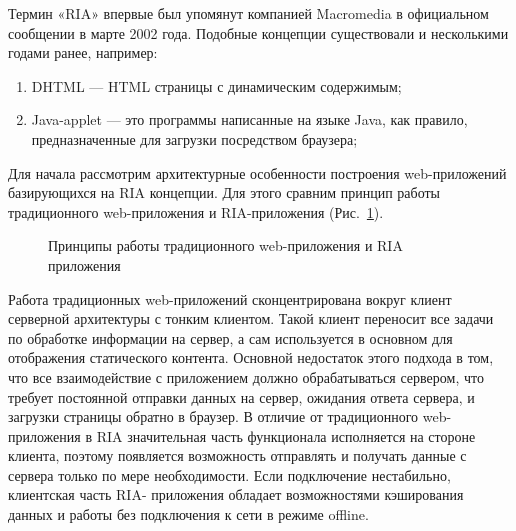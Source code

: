 Термин «RIA» впервые был упомянут компанией Macromedia в официальном сообщении в
марте 2002 года\cite{modeling3}. Подобные концепции существовали и несколькими годами ранее, например:

\begin{enumerate}
\item DHTML --- HTML страницы с динамическим содержимым;
\item Java-applet --- это программы написанные на языке Java, как правило, предназначенные для загрузки посредством
браузера;
\end{enumerate}

Для начала рассмотрим архитектурные особенности построения web-приложений базирующихся 
на RIA концепции. Для этого сравним принцип работы традиционного web-приложения и
RIA-приложения (Рис.~\ref{ris:principlesRIA.png}).
\begin{figure}[ht]
\caption{Принципы работы традиционного web-приложения и RIA приложения}
\label{ris:principlesRIA.png}
\end{figure}

Работа традиционных web-приложений сконцентрирована вокруг клиент серверной архитектуры 
с тонким клиентом. Такой клиент переносит все задачи по обработке информации на сервер,
а сам используется в основном для отображения статического контента. Основной
недостаток этого подхода в том, что все взаимодействие с приложением должно
обрабатываться сервером, что требует постоянной отправки данных на сервер,
ожидания ответа сервера, и загрузки страницы обратно в браузер. В отличие от 
традиционного web-приложения в RIA значительная часть функционала исполняется на
стороне клиента, поэтому появляется возможность отправлять и получать данные с сервера
только по мере необходимости.\cite{modeling1} Если подключение нестабильно, клиентская часть RIA-
приложения обладает возможностями кэширования данных и работы без подключения к сети в 
режиме offline.

